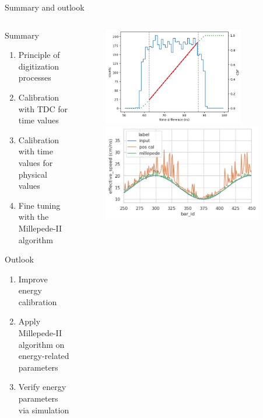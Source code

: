 \documentclass{ikpKoeln}
\begin{document}
\begin{frame}[t]{Summary and outlook}
	\vspace{-2em}
	\begin{columns}[t]
		\begin{column}{0.45 \textwidth}
			\begin{block} {\small Summary}
				\begin{enumerate}
					\setlength\itemsep{0em}
					\item Principle of digitization processes
					\item Calibration with TDC for time values
					\item Calibration with time values for physical values
					\item Fine tuning with the Millepede-II algorithm
				\end{enumerate}
			\end{block}
			\begin{exampleblock} {\small Outlook}
				\begin{enumerate}
					\setlength\itemsep{0em}
					\item Improve energy calibration
					\item Apply Millepede-II algorithm on energy-related parameters
					\item Verify energy parameters via simulation
				\end{enumerate}
			\end{exampleblock}
		\end{column}
		\begin{column}{0.45 \textwidth}
			\begin{figure}
				\includegraphics[width = 0.8\textwidth]{neuland/position_cal/TimeDifference4.png}
				\includegraphics[width = 0.9\textwidth]{neuland/millepede/sim_eff_c.png}

\end{figure}
\end{column}
\end{columns}
\end{frame}
\end{document}
